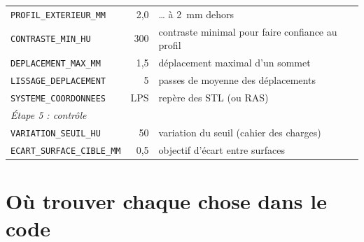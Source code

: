 \documentclass[11pt,a4paper]{article}
\begin{document}
\begin{longtable}{p{5.6cm}rp{7.4cm}}
\texttt{PROFIL\_EXTERIEUR\_MM} & 2,0 & \ldots{} à 2~mm dehors \\
\texttt{CONTRASTE\_MIN\_HU} & 300 & contraste minimal pour faire confiance au profil \\
\texttt{DEPLACEMENT\_MAX\_MM} & 1,5 & déplacement maximal d'un sommet \\
\texttt{LISSAGE\_DEPLACEMENT} & 5 & passes de moyenne des déplacements \\
\texttt{SYSTEME\_COORDONNEES} & LPS & repère des STL (ou RAS) \\
\multicolumn{3}{l}{\textit{Étape 5 : contrôle}} \\
\texttt{VARIATION\_SEUIL\_HU} & 50 & variation du seuil (cahier des charges) \\
\texttt{ECART\_SURFACE\_CIBLE\_MM} & 0,5 & objectif d'écart entre surfaces \\
\bottomrule
\end{longtable}

\section{Où trouver chaque chose dans le code}
\label{ann-code}
\end{document}
